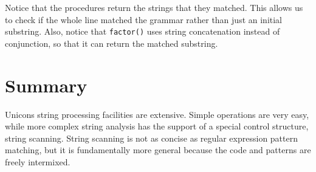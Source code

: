 Notice that the procedures return the strings that they matched. This
allows us to check if the whole line matched the grammar rather than
just an initial substring. Also, notice that \texttt{factor()} uses
string concatenation instead of conjunction, so that it can return the
matched substring.

\section*{Summary}

Unicon{\textquotesingle}s string processing facilities are extensive.
Simple operations are very easy, while more complex string analysis has
the support of a special control structure, string scanning. String
scanning is not as concise as regular expression pattern matching, but
it is fundamentally more general because the code and patterns are
freely intermixed.

